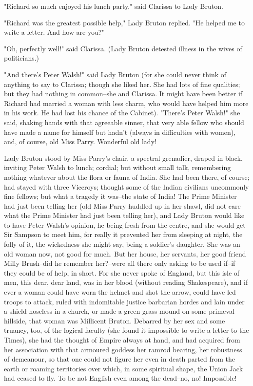 \documentclass[lang=cn,10pt]{elegantbook}
\begin{document}
"Richard so much enjoyed his lunch party," said Clarissa to Lady
Bruton.

"Richard was the greatest possible help," Lady Bruton replied.  "He
helped me to write a letter.  And how are you?"

"Oh, perfectly well!" said Clarissa.  (Lady Bruton detested illness
in the wives of politicians.)

"And there's Peter Walsh!" said Lady Bruton (for she could never
think of anything to say to Clarissa; though she liked her.  She
had lots of fine qualities; but they had nothing in common--she and
Clarissa.  It might have been better if Richard had married a woman
with less charm, who would have helped him more in his work.  He
had lost his chance of the Cabinet).  "There's Peter Walsh!" she
said, shaking hands with that agreeable sinner, that very able
fellow who should have made a name for himself but hadn't (always
in difficulties with women), and, of course, old Miss Parry.
Wonderful old lady!

Lady Bruton stood by Miss Parry's chair, a spectral grenadier,
draped in black, inviting Peter Walsh to lunch; cordial; but
without small talk, remembering nothing whatever about the flora or
fauna of India.  She had been there, of course; had stayed with
three Viceroys; thought some of the Indian civilians uncommonly
fine fellows; but what a tragedy it was--the state of India!  The
Prime Minister had just been telling her (old Miss Parry huddled up
in her shawl, did not care what the Prime Minister had just been
telling her), and Lady Bruton would like to have Peter Walsh's
opinion, he being fresh from the centre, and she would get Sir
Sampson to meet him, for really it prevented her from sleeping at
night, the folly of it, the wickedness she might say, being a
soldier's daughter.  She was an old woman now, not good for much.
But her house, her servants, her good friend Milly Brush--did he
remember her?--were all there only asking to be used if--if they
could be of help, in short.  For she never spoke of England, but
this isle of men, this dear, dear land, was in her blood (without
reading Shakespeare), and if ever a woman could have worn the
helmet and shot the arrow, could have led troops to attack, ruled
with indomitable justice barbarian hordes and lain under a shield
noseless in a church, or made a green grass mound on some primeval
hillside, that woman was Millicent Bruton.  Debarred by her sex and
some truancy, too, of the logical faculty (she found it impossible
to write a letter to the Times), she had the thought of Empire
always at hand, and had acquired from her association with that
armoured goddess her ramrod bearing, her robustness of demeanour,
so that one could not figure her even in death parted from the
earth or roaming territories over which, in some spiritual shape,
the Union Jack had ceased to fly.  To be not English even among the
dead--no, no!  Impossible!
\end{document}
